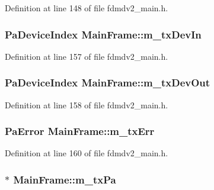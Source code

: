 Definition at line 148 of file fdmdv2\-\_\-main.\-h.

\hypertarget{class_main_frame_a5d89367413fe47a5d82b6aa7c7827746}{
\subsubsection[{m\-\_\-tx\-Dev\-In}]{\setlength{\rightskip}{0pt plus 5cm}Pa\-Device\-Index Main\-Frame\-::m\-\_\-tx\-Dev\-In}}\label{class_main_frame_a5d89367413fe47a5d82b6aa7c7827746}


Definition at line 157 of file fdmdv2\-\_\-main.\-h.

\hypertarget{class_main_frame_aac31ac35a3c5bb4847e94501f18f3eab}{
\subsubsection[{m\-\_\-tx\-Dev\-Out}]{\setlength{\rightskip}{0pt plus 5cm}Pa\-Device\-Index Main\-Frame\-::m\-\_\-tx\-Dev\-Out}}\label{class_main_frame_aac31ac35a3c5bb4847e94501f18f3eab}


Definition at line 158 of file fdmdv2\-\_\-main.\-h.

\hypertarget{class_main_frame_a9af2231b1aac90f8c6abdede80eb0911}{
\subsubsection[{m\-\_\-tx\-Err}]{\setlength{\rightskip}{0pt plus 5cm}Pa\-Error Main\-Frame\-::m\-\_\-tx\-Err}}\label{class_main_frame_a9af2231b1aac90f8c6abdede80eb0911}


Definition at line 160 of file fdmdv2\-\_\-main.\-h.

\hypertarget{class_main_frame_a2bedcb7f813060b8fb918ec315496f17}{
\subsubsection[{m\-\_\-tx\-Pa}]{$\ast$ Main\-Frame\-::m\-\_\-tx\-Pa}}\label{class_main_frame_a2bedcb7f813060b8fb918ec315496f17}


